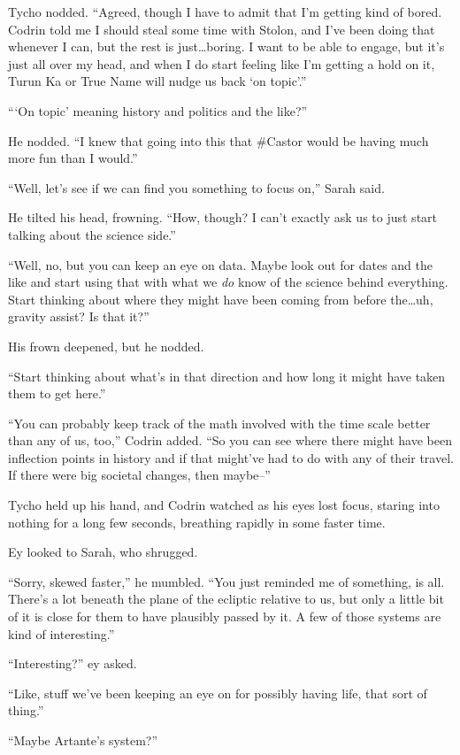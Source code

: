 Tycho nodded. ``Agreed, though I have to admit that I'm getting kind of bored. Codrin told me I should steal some time with Stolon, and I've been doing that whenever I can, but the rest is just\ldots boring. I want to be able to engage, but it's just all over my head, and when I do start feeling like I'm getting a hold on it, Turun Ka or True Name will nudge us back `on topic'.''

```On topic' meaning history and politics and the like?''

He nodded. ``I knew that going into this that \#Castor would be having much more fun than I would.''

``Well, let's see if we can find you something to focus on,'' Sarah said.

He tilted his head, frowning. ``How, though? I can't exactly ask us to just start talking about the science side.''

``Well, no, but you can keep an eye on data. Maybe look out for dates and the like and start using that with what we \emph{do} know of the science behind everything. Start thinking about where they might have been coming from before the\ldots uh, gravity assist? Is that it?''

His frown deepened, but he nodded.

``Start thinking about what's in that direction and how long it might have taken them to get here.''

``You can probably keep track of the math involved with the time scale better than any of us, too,'' Codrin added. ``So you can see where there might have been inflection points in history and if that might've had to do with any of their travel. If there were big societal changes, then maybe--''

Tycho held up his hand, and Codrin watched as his eyes lost focus, staring into nothing for a long few seconds, breathing rapidly in some faster time.

Ey looked to Sarah, who shrugged.

``Sorry, skewed faster,'' he mumbled. ``You just reminded me of something, is all. There's a lot beneath the plane of the ecliptic relative to us, but only a little bit of it is close for them to have plausibly passed by it. A few of those systems are kind of interesting.''

``Interesting?'' ey asked.

``Like, stuff we've been keeping an eye on for possibly having life, that sort of thing.''

``Maybe Artante's system?''

